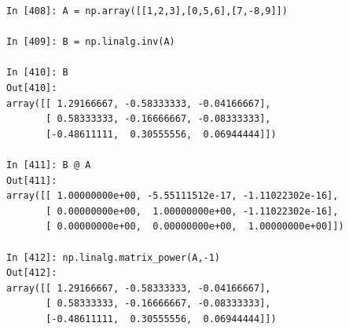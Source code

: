 \begin{center}
\begin{minipage}{0.7\textwidth}
\begin{verbatim}
In [408]: A = np.array([[1,2,3],[0,5,6],[7,-8,9]])

In [409]: B = np.linalg.inv(A)

In [410]: B
Out[410]: 
array([[ 1.29166667, -0.58333333, -0.04166667],
       [ 0.58333333, -0.16666667, -0.08333333],
       [-0.48611111,  0.30555556,  0.06944444]])

In [411]: B @ A
Out[411]: 
array([[ 1.00000000e+00, -5.55111512e-17, -1.11022302e-16],
       [ 0.00000000e+00,  1.00000000e+00, -1.11022302e-16],
       [ 0.00000000e+00,  0.00000000e+00,  1.00000000e+00]])

In [412]: np.linalg.matrix_power(A,-1)
Out[412]: 
array([[ 1.29166667, -0.58333333, -0.04166667],
       [ 0.58333333, -0.16666667, -0.08333333],
       [-0.48611111,  0.30555556,  0.06944444]])
\end{verbatim}
\end{minipage}
\end{center}
